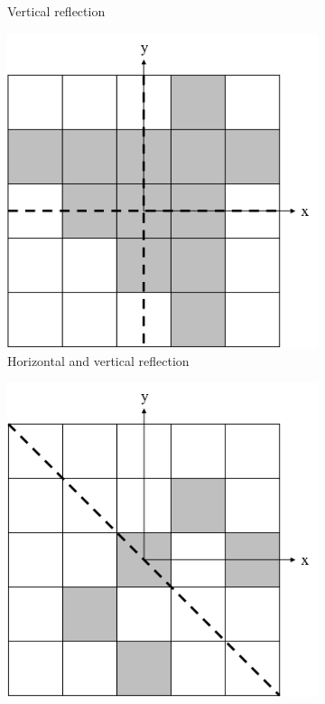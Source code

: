 \begin{figure}[H]
\begin{subfigure}[t]{0.3\textwidth}
		\caption{Vertical reflection}
	\end{subfigure}
	\hfill
	\begin{subfigure}[t]{0.3\textwidth}
		\centering
		\includegraphics[width=\textwidth]{LSSymRefHV.png}
		\caption{Horizontal and vertical reflection}
	\end{subfigure}
	\hfill
	\begin{subfigure}[t]{0.3\textwidth}
		\centering
		\includegraphics[width=\textwidth]{LSSymRefD.png}

\end{subfigure}
\end{figure}
